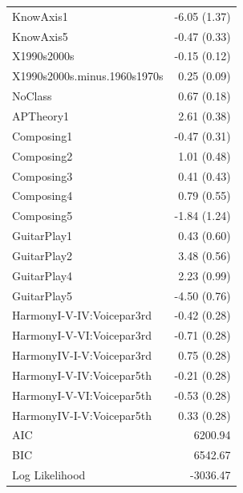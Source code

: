 \documentclass{article}
\begin{document}
\begin{center}
\begin{longtable}{l D{)}{)}{9)0}}
KnowAxis1                                        & -6.05 \; (1.37) \\
KnowAxis5                                        & -0.47 \; (0.33) \\
X1990s2000s                                      & -0.15 \; (0.12) \\
X1990s2000s.minus.1960s1970s                     & 0.25 \; (0.09)  \\
NoClass                                          & 0.67 \; (0.18)  \\
APTheory1                                        & 2.61 \; (0.38)  \\
Composing1                                       & -0.47 \; (0.31) \\
Composing2                                       & 1.01 \; (0.48)  \\
Composing3                                       & 0.41 \; (0.43)  \\
Composing4                                       & 0.79 \; (0.55)  \\
Composing5                                       & -1.84 \; (1.24) \\
GuitarPlay1                                      & 0.43 \; (0.60)  \\
GuitarPlay2                                      & 3.48 \; (0.56)  \\
GuitarPlay4                                      & 2.23 \; (0.99)  \\
GuitarPlay5                                      & -4.50 \; (0.76) \\
HarmonyI-V-IV:Voicepar3rd                        & -0.42 \; (0.28) \\
HarmonyI-V-VI:Voicepar3rd                        & -0.71 \; (0.28) \\
HarmonyIV-I-V:Voicepar3rd                        & 0.75 \; (0.28)  \\
HarmonyI-V-IV:Voicepar5th                        & -0.21 \; (0.28) \\
HarmonyI-V-VI:Voicepar5th                        & -0.53 \; (0.28) \\
HarmonyIV-I-V:Voicepar5th                        & 0.33 \; (0.28)  \\
\midrule
AIC                                              & 6200.94         \\
BIC                                              & 6542.67         \\
Log Likelihood                                   & -3036.47        \\

\end{longtable}
\end{center}
\end{document}
